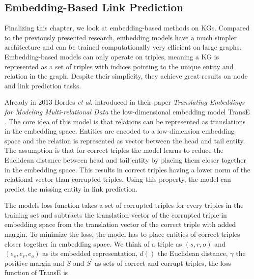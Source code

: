 

\subsection{Embedding-Based Link Prediction}
\label{ssec:embedlp}
Finalizing this chapter, we look at embedding-based methods on KGs.
Compared to the previously presented research, embedding models have a much simpler architecture and can be trained computationally very efficient on large graphs. Embedding-based models can only operate on triples, meaning a KG is represented as a set of triples with indices pointing to the unique entity and relation in the graph. Despite their simplicity, they achieve great results on node and link prediction tasks.

Already in 2013 Bordes \textit{et al.} introduced in their paper \textit{Translating Embeddings for Modeling Multi-relational Data} the low-dimensional embedding model TransE \cite{bordes_translating_2013}. The core idea of this model is that relations can be represented as translations in the embedding space. Entities are encoded to a low-dimension embedding space and the relation is represented as vector between the head and tail entity. The assumption is that for correct triples the model learns to reduce the Euclidean distance between head and tail entity by placing them closer together in the embedding space. This results in correct triples having a lower norm of the relational vector than corrupted triples. Using this property, the model can predict the missing entity in link prediction.

The models loss function takes a set of corrupted triples for every triples in the training set and subtracts the translation vector of the corrupted triple in embedding space from the translation vector of the correct triple with added margin. To minimize the loss, the model has to place entities of correct triples closer together in embedding space. We think of a triple as $(s,r,o)$ and $(e_s,e_r,e_o)$ as its embedded representation, $d()$ the Euclidean distance, $\gamma$ the positive margin and $S$ and $S^{\prime}$ as sets of correct and corrupt triples, the loss function of TransE is 

